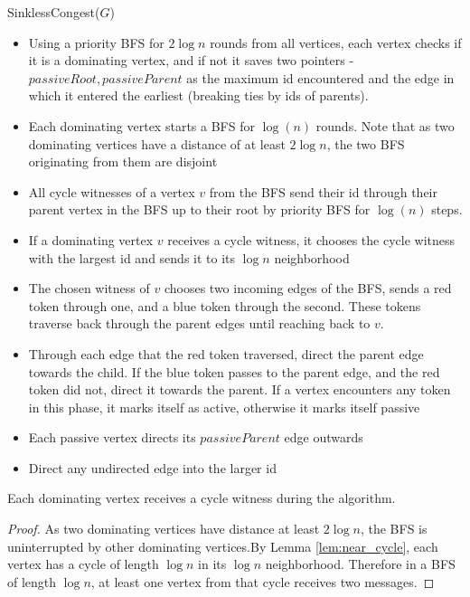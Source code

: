 \begin{algorithm}[H]\label{alg:sinkless_congest}\small
	\caption{\small SinklessCongest($G$)}
	\begin{itemize}
		\item Using a priority BFS for $2\log{n}$ rounds from all vertices, each vertex checks if it is a dominating vertex, and if not it saves two pointers - $passiveRoot,passiveParent$ as the maximum id encountered and the edge in which it entered the earliest (breaking ties by ids of parents).
		\item Each dominating vertex starts a BFS for $\log(n)$ rounds. Note that as two dominating vertices have a distance of at least $2\log{n}$, the two BFS originating from them are disjoint
		\item All cycle witnesses of a vertex $v$ from the BFS send their id through their parent vertex in the BFS up to their root by priority BFS for $\log(n)$ steps. 
		\item If a dominating vertex $v$ receives a cycle witness, it chooses the cycle witness with the largest id and sends it to its $\log{n}$ neighborhood
		\item The chosen witness of $v$ chooses two incoming edges of the BFS, sends a red token through one, and a blue token through the second. These tokens traverse back through the parent edges until reaching back to $v$. 
		\item Through each edge that the red token traversed, direct the parent edge towards the child. If the blue token passes to the parent edge, and the red token did not, direct it towards the parent. If a vertex encounters any token in this phase, it marks itself as active, otherwise it marks itself passive
		\item Each passive vertex directs its $passiveParent$ edge outwards  
		\item Direct any undirected edge into the larger id 
	\end{itemize}
\end{algorithm}

\begin{lemma}
	Each dominating vertex receives a cycle witness during the algorithm.
\end{lemma}
\begin{proof}
	As two dominating vertices have distance at least $2\log{n}$, the BFS is uninterrupted by other dominating vertices.By Lemma \ref{lem:near_cycle}, each vertex has a cycle of length $\log{n}$ in its $\log{n}$ neighborhood. Therefore in a BFS of length $\log{n}$, at least one vertex from that cycle receives two messages.
\end{proof}

